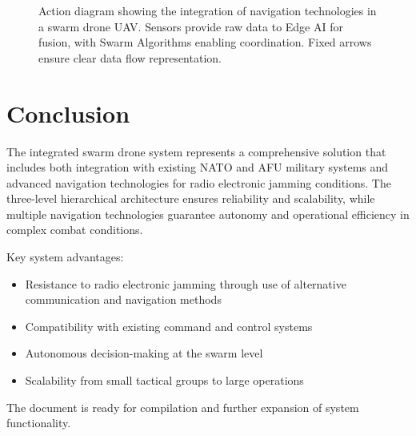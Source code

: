 \documentclass[12pt]{article}
\begin{document}
\begin{figure}[h]
    \caption{Action diagram showing the integration of navigation technologies in a swarm drone UAV. Sensors provide raw data to Edge AI for fusion, with Swarm Algorithms enabling coordination. Fixed arrows ensure clear data flow representation.}
    \label{fig:action_diagram}
\end{figure}

\section{Conclusion}

The integrated swarm drone system represents a comprehensive solution that includes both integration with existing NATO and AFU military systems and advanced navigation technologies for radio electronic jamming conditions. The three-level hierarchical architecture ensures reliability and scalability, while multiple navigation technologies guarantee autonomy and operational efficiency in complex combat conditions.

Key system advantages:
\begin{itemize}
    \item Resistance to radio electronic jamming through use of alternative communication and navigation methods
    \item Compatibility with existing command and control systems
    \item Autonomous decision-making at the swarm level
    \item Scalability from small tactical groups to large operations
\end{itemize}

The document is ready for compilation and further expansion of system functionality.
\end{document}
